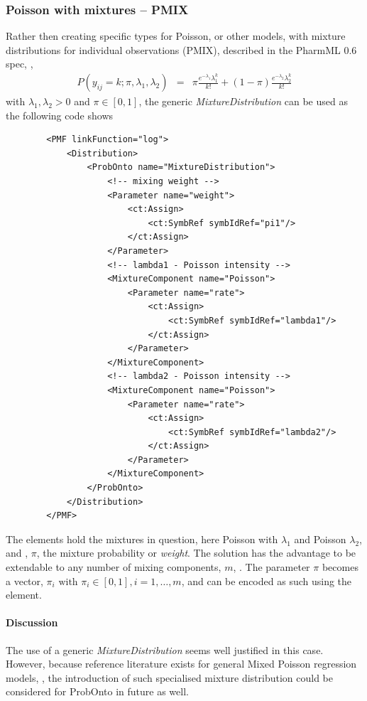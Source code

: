 {\subsubsection{Poisson with mixtures -- PMIX}
Rather then creating specific types for Poisson, or other models, with mixture distributions for 
individual observations (PMIX), described in the PharmML 0.6 spec, \cite{Pharmml_06},
\begin{eqnarray}
P(y_{ij} = k;\pi,\lambda_1,\lambda_2) &=& \pi \frac{e^{-\lambda_1} \lambda_1^k}{k!} + (1-\pi) \frac{e^{-\lambda_2} \lambda_2^k}{k!} \nonumber
\end{eqnarray}
with $\lambda_1, \lambda_2 > 0$ and $\pi \in [0,1]$, the generic \emph{MixtureDistribution} 
can be used as the following code shows
\lstset{language=XML}
\begin{lstlisting}
        <PMF linkFunction="log">
            <Distribution>
                <ProbOnto name="MixtureDistribution">
                    <!-- mixing weight -->
                    <Parameter name="weight">
                        <ct:Assign>
                            <ct:SymbRef symbIdRef="pi1"/>
                        </ct:Assign>
                    </Parameter>
                    <!-- lambda1 - Poisson intensity -->
                    <MixtureComponent name="Poisson">
                        <Parameter name="rate">
                            <ct:Assign>
                                <ct:SymbRef symbIdRef="lambda1"/>
                            </ct:Assign>
                        </Parameter>
                    </MixtureComponent>
                    <!-- lambda2 - Poisson intensity -->
                    <MixtureComponent name="Poisson">
                        <Parameter name="rate">
                            <ct:Assign>
                                <ct:SymbRef symbIdRef="lambda2"/>
                            </ct:Assign>
                        </Parameter>
                    </MixtureComponent>
                </ProbOnto>
            </Distribution>
        </PMF>
\end{lstlisting}
The  elements hold the mixtures in question, here
Poisson with $\lambda_1$ and Poisson $\lambda_2$, and 
, $\pi$, the mixture probability or \emph{weight}. The solution has the advantage 
to be extendable to any number of mixing components, $m$, \cite{forbes2011statistical}. 
The parameter $\pi$ becomes a vector, $\pi_i \text{ with } \pi_i \in [0,1], i=1,\dots,m$, 
and can be encoded as such using the  element.
\paragraph{Discussion}
The use of a generic \emph{MixtureDistribution} seems well justified in this case. 
However, because reference literature exists for general Mixed Poisson regression models, 
\cite{Wang:1996fj}, the introduction of such specialised mixture distribution 
could be considered for ProbOnto in future as well.



}

